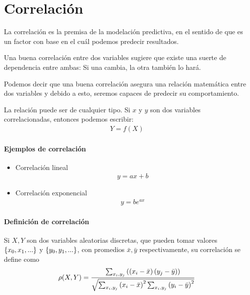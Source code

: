\section{Correlación}

 La correlación es la premisa de la modelación predictiva, en el sentido de que es un factor con base en el cuál podemos predecir resultados.


Una buena correlación entre dos variables sugiere que existe una suerte de dependencia entre ambas:  Si una cambia, la otra también lo hará. 

Podemos decir que una buena correlación asegura una relación matemática entre dos variables y debido a esto, seremos capaces de predecir su comportamiento.


La relación puede ser de cualquier tipo.  Si $x$ y $y$ son dos variables correlacionadas, entonces podemos escribir:
\begin{align}
Y=f(X)
\end{align}

\paragraph{Ejemplos de correlación}
\begin{itemize}
 \item Correlación lineal
 \begin{align}
 y = ax+b
\end{align}
\item Correlación exponencial
\begin{align}
 y = be^{ax}
\end{align}
\end{itemize}


\paragraph{Definición de correlación} Si $X,Y$ son dos variables aleatorias discretas, que pueden tomar valores $\left\{ x_{0},x_{1},... \right\}$ y $\left\{ y_{0},y_{1},... \right\}$, con promedios $\bar{x}, \bar{y}$  respectivamente, su correlación se define como
\begin{align}
 \rho(X,Y) = \dfrac{\sum_{x_{i},y_{j}}
 \left( \left( x_{i}-\bar{x} \right)\left( y_{j}-\bar{y} \right) \right)}
 {\sqrt{\sum_{x_{i},y_{j}}
 \left( x_{i}-\bar{x} \right)^{2}\sum_{x_{i},y_{j}}
 \left( y_{i}-\bar{y} \right)^{2}}}
\end{align}




